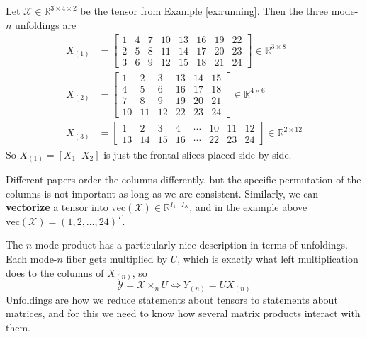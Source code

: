   \begin{example}
    \label{ex:unfoldings-of-a-3times4times2-tensor}
    Let $\mathcal{X} \in \mathbb{R}^{3 \times 4 \times 2}$ be the tensor from Example \ref{ex:running}. Then the three mode-$n$ unfoldings are
    \begin{align}
      X_{(1)} & = \begin{bmatrix} 1 & 4 & 7 & 10 & 13 & 16 & 19 & 22 \\ 2 & 5 & 8 & 11 & 14 & 17 & 20 & 23 \\ 3 & 6 & 9 & 12 & 15 & 18 & 21 & 24 \end{bmatrix} \in \mathbb{R}^{3 \times 8} \\
      X_{(2)} & = \begin{bmatrix} 1 & 2 & 3 & 13 & 14 & 15 \\ 4 & 5 & 6 & 16 & 17 & 18 \\ 7 & 8 & 9 & 19 & 20 & 21 \\ 10 & 11 & 12 & 22 & 23 & 24 \end{bmatrix} \in \mathbb{R}^{4 \times 6} \\
      X_{(3)} & = \begin{bmatrix} 1 & 2 & 3 & 4 & \cdots & 10 & 11 & 12 \\ 13 & 14 & 15 & 16 & \cdots & 22 & 23 & 24 \end{bmatrix} \in \mathbb{R}^{2 \times 12}
    \end{align}
    So $X_{(1)} = [X_1 \;\; X_2]$ is just the frontal slices placed side by side.
  \end{example}

  Different papers order the columns differently, but the specific permutation of the columns is not important as long as we are consistent. Similarly, we can \textbf{vectorize} a tensor into $\mathrm{vec}(\mathcal{X}) \in \mathbb{R}^{I_1 \cdots I_N}$, and in the example above $\mathrm{vec}(\mathcal{X}) = (1, 2, \ldots, 24)^T$.

  The $n$-mode product has a particularly nice description in terms of unfoldings. Each mode-$n$ fiber gets multiplied by $U$, which is exactly what left multiplication does to the columns of $X_{(n)}$, so
  \begin{equation}
    \mathcal{Y} = \mathcal{X} \times_n U \iff Y_{(n)} = U X_{(n)}
  \end{equation}
  Unfoldings are how we reduce statements about tensors to statements about matrices, and for this we need to know how several matrix products interact with them.

